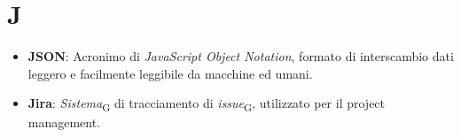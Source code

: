 \section{J}
\begin{itemize}
    \item \textbf{JSON}: Acronimo di \textit{JavaScript Object Notation}, formato di interscambio dati leggero e facilmente leggibile da macchine ed umani.
    \item \textbf{Jira}: \textit{Sistema}\textsubscript{G} di tracciamento di \textit{issue}\textsubscript{G}, utilizzato per il project management.
\end{itemize}
